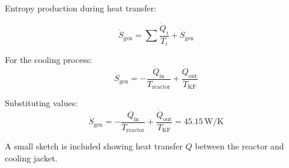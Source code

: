 Entropy production during heat transfer:  

\[
\dot{S}_{\text{gen}} = \sum \frac{\dot{Q}_i}{T_i} + \dot{S}_{\text{gen}}
\]  

For the cooling process:  
\[
\dot{S}_{\text{gen}} = -\frac{\dot{Q}_{\text{in}}}{T_{\text{reactor}}} + \frac{\dot{Q}_{\text{out}}}{T_{\text{KF}}}
\]  

Substituting values:  
\[
\dot{S}_{\text{gen}} = -\frac{Q_{\text{in}}}{T_{\text{reactor}}} + \frac{\dot{Q}_{\text{out}}}{T_{\text{KF}}} = 45.15 \, \text{W/K}
\]  

A small sketch is included showing heat transfer \( Q \) between the reactor and cooling jacket.